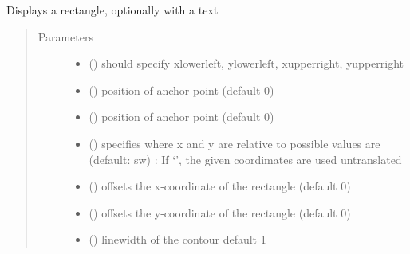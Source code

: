 \documentclass[letterpaper,10pt,english]{sphinxmanual}
\begin{document}
\begin{fulllineitems}
\label{\detokenize{Reference:salabim.AnimateRectangle}}
Displays a rectangle, optionally with a text
\begin{quote}\begin{description}
\item[{Parameters}] \leavevmode\begin{itemize}
\item {} 
 () \textendash{} should specify xlowerleft, ylowerleft, xupperright, yupperright

\item {} 
 () \textendash{} position of anchor point (default 0)

\item {} 
 () \textendash{} position of anchor point (default 0)

\item {} 
 () \textendash{} specifies where x and y are relative to 
possible values are (default: sw) : 
If ‘’, the given coordimates are used untranslated

\item {} 
 () \textendash{} offsets the x-coordinate of the rectangle (default 0)

\item {} 
 () \textendash{} offsets the y-coordinate of the rectangle (default 0)

\item {} 
 () \textendash{} linewidth of the contour 
default 1


\end{itemize}
\end{description}
\end{quote}
\end{fulllineitems}
\end{document}
